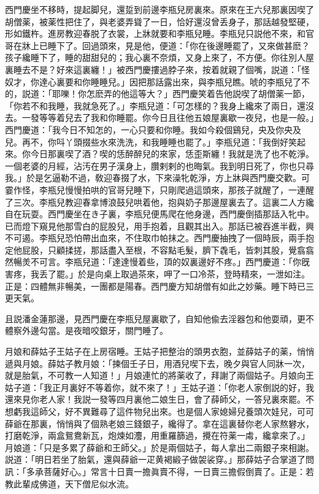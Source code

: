 西門慶坐不移時，提起脚兒，還踅到前邊李瓶兒房裏來。原來在王六兒那裏因喫了胡僧薬，被薬性把住了，與老婆弄聳了一日，恰好還沒曾丢身子，那話越發堅硬，形如鐵杵。進房教迎春脱了衣裳，上牀就要和李瓶兒睡。李瓶兒只説他不來，和官哥在牀上已睡下了。回過頭來，見是他，便道：「你在後邊睡罷了，又來做甚麽？孩子纔睡下了，睡的甜甜兒的；我心裏不奈煩，又身上來了，不方便。你往別人屋裏睡去不是？好來這裏纏！」被西門慶摟過脖子來，按着就親了個嘴，説道：「怪奴才，你達心裏要和你睡睡兒。」因把那話露出來，與李瓶兒瞧。唬的李瓶兒了不的，説道：「耶嚛！你怎麽弄的他這等大？」西門慶笑着告他説喫了胡僧薬一節，「你若不和我睡，我就急死了。」李瓶兒道：「可怎樣的？我身上纔來了兩日，還沒去。一發等等着兒去了我和你睡罷。你今日且往他五娘屋裏歇一夜兒，也是一般。」西門慶道：「我今日不知怎的，一心只要和你睡。我如今殺個鷄兒，央及你央及兒。再不，你呌丫頭掇些水來洗洗，和我睡睡也罷了。」李瓶兒道：「我倒好笑起來。你今日那裏喫了酒？喫的恁醉醉兒的來家，恁歪斯纏！我就是洗了也不乾淨。一個老婆的月經，沾汚在男子漢身上，臢剌剌的也晦氣。我到明日死了，你也只尋我。」於是乞逼勒不過，敎迎春掇了水，下來澡牝乾淨，方上牀與西門慶交歡。可霎作怪，李瓶兒慢慢拍哄的官哥兒睡下，只剛爬過這頭來，那孩子就醒了，一連醒了三次。李瓶兒教迎春拿博浪鼓兒哄着他，抱與奶子那邊屋裏去了。這裏二人方纔自在玩耍。西門慶坐在き子裏，李瓶兒便馬爬在他身邊，西門慶倒插那話入牝中。已而燈下窺見他那雪白的屁股兒，用手抱着，且觀其出入。那話已被吞進半截，興不可遏。李瓶兒恐怕帶出血來，不住取巾帕抹之。西門慶抽拽了一個時辰，兩手抱定他屁股，只顧揉搓，那話盡入至根，不容點毛髮，臍下毳毛，皆刺其股，覺翕翕然暢羙不可言。李瓶兒道：「達達慢着些，頂的奴裏邊好不疼。」西門慶道：「你旣害疼，我丢了罷。」於是向桌上取過茶來，呷了一口冷茶，登時精來，一泄如注。正是：四體無非暢美，一團都是陽春。西門慶方知胡僧有如此之妙藥。睡下時已三更天氣。

且説潘金蓮那邊，見西門慶在李瓶兒屋裏歇了，自知他偸去淫器包和他耍頑，更不體察外邊勾當。是夜暗咬銀牙，關門睡了。

月娘和薛姑子王姑子在上房宿睡。王姑子把整治的頭男衣胞，並薛姑子的薬，悄悄遞與月娘。薛姑子教月娘：「揀個壬子日，用酒兒喫下去，晚夕與官人同牀一次，就是胎氣，不可教一人知道！」月娘連忙的將薬收了，拜謝了兩個姑子。月娘向王姑子道：「我正月裏好不等着你，就不來了！」王姑子道：「你老人家倒説的好，我還來見你老人家！我説一發等四月裏他二娘生日，會了薛師父，一答兒裏來罷。不想虧我這師父，好不異難尋了這件物兒出來。也是個人家媳婦兒養頭次娃兒，可可薛爺在那裏，悄悄與了個熟老娘三錢銀子，纔得了。拿在這裏替你老人家熬礬水，打磨乾淨，兩盒鴛鴦新瓦，炮煉如灋，用重羅篩過，攪在符薬一䖏，纔拿來了。」月娘道：「只是多累了薛爺和王師父。」於是兩個姑子，每人拿出二兩銀子來相謝。説道：「明日若坐了胎氣，還與薛爺一疋黄褐緞子做袈裟穿。」那薛姑子合掌道了問訊：「多承菩薩好心。」常言十日賣一擔眞賣不得，一日賣三擔假倒賣了。正是：若教此輩成佛道，天下僧尼似水流。

